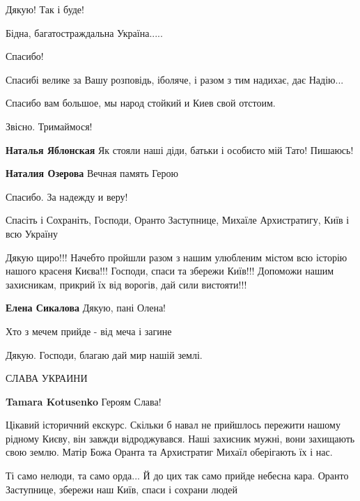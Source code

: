 \begin{itemize}
Дякую! Так і буде!

Бідна, багатостраждальна Україна.....

Спасибо!

Спасибі велике за Вашу розповідь, іболяче, і разом з тим надихає, дає Надію...

Спасибо вам большое, мы народ стойкий и Киев свой отстоим.

\begin{itemize} %
Звісно. Тримаймося!

\textbf{Наталья Яблонская} Як стояли наші діди, батьки і особисто мій Тато! Пишаюсь!

\textbf{Наталия Озерова} Вечная память Герою
\end{itemize} %

Спасибо. За надежду и веру!

Спасіть і Сохраніть, Господи, Оранто Заступнице, Михаїле Архистратигу, Київ і всю Україну


Дякую щиро!!! Начебто пройшли разом з нашим улюбленим містом всю історію нашого
красеня Києва!!! Господи, спаси та збережи Київ!!! Допоможи нашим захисникам,
прикрий їх від ворогів, дай сили вистояти!!!


\textbf{Елена Сикалова} Дякую, пані Олена!

Хто з мечем прийде - від меча і загине

Дякую. Господи, благаю дай мир нашій землі.

СЛАВА УКРАИНИ

\textbf{Tamara Kotusenko} Героям Слава!


Цікавий історичний екскурс. Скільки б навал не прийшлось пережити нашому
рідному Києву, він завжди відроджувався. Наші захисник мужні, вони захищають
свою землю. Матір Божа Оранта та Архистратиг Михаїл оберігають їх і нас.


Ті само нелюди, та само орда... Й до цих так само прийде небесна кара. Оранто
Заступнице, збережи наш Київ, спаси і сохрани людей


\end{itemize}
